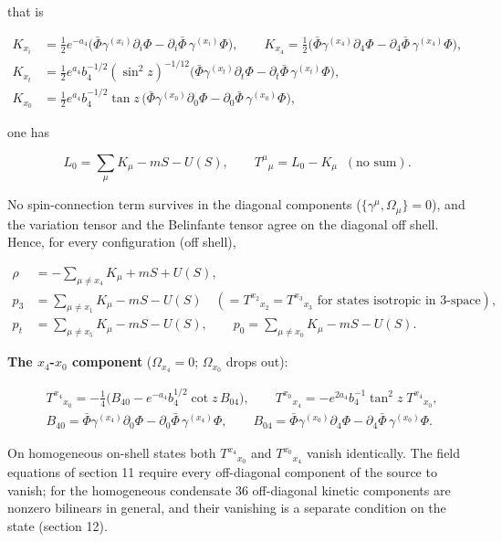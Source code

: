 \documentclass[11pt]{article}
\begin{document}
that is

\[
\begin{aligned}
K_{x_i} &= \tfrac12 e^{-a_4}\big(\bar\Phi\gamma^{(x_i)}\partial_i\Phi - \partial_i\bar\Phi\,\gamma^{(x_i)}\Phi\big), \qquad K_{x_4} = \tfrac12\big(\bar\Phi\gamma^{(x_4)}\partial_4\Phi - \partial_4\bar\Phi\,\gamma^{(x_4)}\Phi\big), \\
K_{x_t} &= \tfrac12 e^{a_4}b_4^{-1/2}(\sin^2 z)^{-1/12}\big(\bar\Phi\gamma^{(x_t)}\partial_t\Phi - \partial_t\bar\Phi\,\gamma^{(x_t)}\Phi\big), \\
K_{x_0} &= \tfrac12 e^{a_4}b_4^{-1/2}\tan z\,\big(\bar\Phi\gamma^{(x_0)}\partial_0\Phi - \partial_0\bar\Phi\,\gamma^{(x_0)}\Phi\big),
\end{aligned}
\]

one has

\[
L_0 = \sum_\mu K_\mu - mS - U(S), \qquad T^\mu{}_\mu = L_0 - K_\mu \;\;(\text{no sum}) .
\]

No spin-connection term survives in the diagonal components ($\{\gamma^\mu, \Omega_\mu\} = 0$), and the variation tensor and the Belinfante tensor agree on the diagonal off shell. Hence, for every configuration (off shell),

\[
\begin{aligned}
\rho &= -\sum_{\mu \ne x_4} K_\mu + mS + U(S), \\
p_3 &= \sum_{\mu \ne x_1} K_\mu - mS - U(S) \quad (= T^{x_2}{}_{x_2} = T^{x_3}{}_{x_3} \text{ for states isotropic in 3-space}), \\
p_t &= \sum_{\mu \ne x_5} K_\mu - mS - U(S), \qquad p_0 = \sum_{\mu \ne x_0} K_\mu - mS - U(S) .
\end{aligned}
\]

\textbf{The $x_4$-$x_0$ component} ($\Omega_{x_4} = 0$; $\Omega_{x_0}$ drops out):

\[
\begin{aligned}
& T^{x_4}{}_{x_0} = -\tfrac14\big(B_{40} - e^{-a_4}b_4^{1/2}\cot z\,B_{04}\big), \qquad T^{x_0}{}_{x_4} = -e^{2a_4}b_4^{-1}\tan^2 z\;T^{x_4}{}_{x_0}, \\
& B_{40} = \bar\Phi\gamma^{(x_4)}\partial_0\Phi - \partial_0\bar\Phi\,\gamma^{(x_4)}\Phi, \qquad B_{04} = \bar\Phi\gamma^{(x_0)}\partial_4\Phi - \partial_4\bar\Phi\,\gamma^{(x_0)}\Phi .
\end{aligned}
\]

On homogeneous on-shell states both $T^{x_4}{}_{x_0}$ and $T^{x_0}{}_{x_4}$ vanish identically. The field equations of section 11 require every off-diagonal component of the source to vanish; for the homogeneous condensate 36 off-diagonal kinetic components are nonzero bilinears in general, and their vanishing is a separate condition on the state (section 12).
\end{document}
